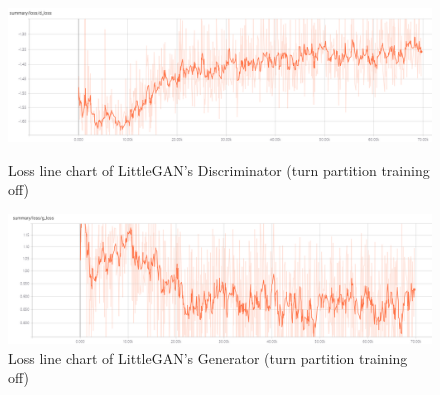     \begin{figure}
        \begin{minipage}[t]{0.49\linewidth}
            \centering
            \includegraphics[width=\textwidth]{figures/loss_part_off_d.png}
            \caption{Loss line chart of LittleGAN's Discriminator (turn partition training off)}
            \label{loss_part_off_d}
        \end{minipage}
            \hfill
        \begin{minipage}[t]{0.49\linewidth}
            \centering
            \includegraphics[width=\textwidth]{figures/loss_part_off_g.png}
            \caption{Loss line chart of LittleGAN's Generator (turn partition training off)}
            \label{loss_part_off_g}
        \end{minipage}
    \end{figure}

